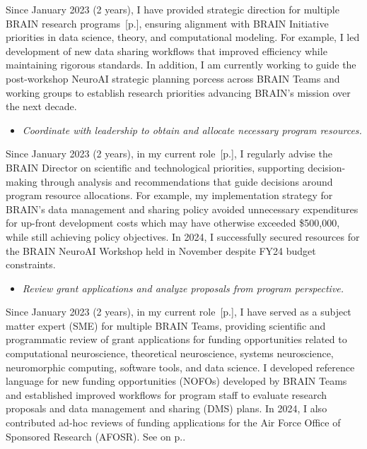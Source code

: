 \documentclass[10pt]{article}
\newcommand{\see}[1]{[\textcolor{hopkinsblue}{p.\pageref{sec:#1}}]}
\newcommand{\cf}[1]{\textcolor{hopkinsblue}{See \emph{\nameref{sec:#1}} on p.\pageref{sec:#1}}}
\begin{document}
Since January 2023 (2 years), I have provided strategic direction for multiple
BRAIN research programs~\see{jobobd}, ensuring alignment with BRAIN Initiative
priorities in data science, theory, and computational modeling. For example, I
led development of new data sharing workflows that improved efficiency while
maintaining rigorous standards. In addition, I am currently working to guide the
post-workshop NeuroAI strategic planning porcess across BRAIN Teams and working
groups to establish research priorities advancing BRAIN's mission over the next
decade.

\begin{itemize}
  \color{hopkinsblue}
  \item \emph{Coordinate with leadership to obtain and allocate necessary
program resources.}
\end{itemize}

Since January 2023 (2 years), in my current role~\see{jobobd}, I regularly
advise the BRAIN Director on scientific and technological priorities, supporting
decision-making through analysis and recommendations that guide decisions around
program resource allocations. For example, my implementation strategy for
BRAIN's data management and sharing policy avoided unnecessary expenditures for
up-front development costs which may have otherwise exceeded \$500,000, while
still achieving policy objectives. In 2024, I successfully secured resources for
the BRAIN NeuroAI Workshop held in November despite FY24 budget constraints.

\begin{itemize}
  \color{hopkinsblue}
  \item \emph{Review grant applications and analyze proposals from program
perspective.}
\end{itemize}

Since January 2023 (2 years), in my current role~\see{jobobd}, I have served as
a subject matter expert (SME) for multiple BRAIN Teams, providing scientific
and programmatic review of grant applications for funding opportunities related
to computational neuroscience, theoretical neuroscience, systems neuroscience,
neuromorphic computing, software tools, and data science. I developed reference
language for new funding opportunities (NOFOs) developed by BRAIN Teams and
established improved workflows for program staff to evaluate research proposals
and data management and sharing (DMS) plans. In 2024, I also contributed ad-hoc
reviews of funding applications for the Air Force Office of Sponsored Research
(AFOSR). \cf{service}.
\end{document}
